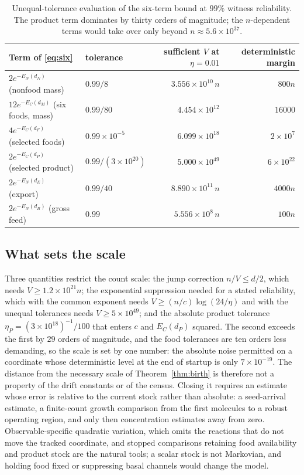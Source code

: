 \documentclass[11pt,letterpaper]{article}
\theoremstyle{plain}
\theoremstyle{definition}
\theoremstyle{remark}
\numberwithin{equation}{section}
\newcommand{\floorstock}{(3\times10^{18})^{-1}}
\begin{document}
\begin{table}[t]
\centering\small
\begin{tabular}{@{}llrr@{}}
\toprule
Term of \eqref{eq:six} & tolerance & sufficient $V$ at $\eta=0.01$ & deterministic margin\\
\midrule
$2e^{-E_N(d_N)}$ (nonfood mass) & $0.99/8$ & $3.556\times10^{10}\,n$ & $800n$\\
$12e^{-E_C(d_M)}$ (six foods, mass) & $0.99/80$ & $4.454\times10^{12}$ & $16000$\\
$4e^{-E_C(d_F)}$ (selected foods) & $0.99\times10^{-5}$ & $6.099\times10^{18}$ & $2\times10^7$\\
$2e^{-E_C(d_P)}$ (selected product) & $0.99/(3\times10^{20})$ & $5.000\times10^{49}$ & $6\times10^{22}$\\
$2e^{-E_N(d_E)}$ (export) & $0.99/40$ & $8.890\times10^{11}\,n$ & $4000n$\\
$2e^{-E_N(d_B)}$ (gross feed) & $0.99$ & $5.556\times10^{8}\,n$ & $100n$\\
\bottomrule
\end{tabular}
\caption{Unequal-tolerance evaluation of the six-term bound at $99\%$ witness reliability. The product term dominates by thirty orders of magnitude; the $n$-dependent terms would take over only beyond $n\approx5.6\times10^{37}$.}
\label{tab:unequal}
\end{table}

\subsection{What sets the scale}
Three quantities restrict the count scale: the jump correction $n/V\le d/2$, which needs $V\ge1.2\times10^{21}n$; the exponential suppression needed for a stated reliability, which with the common exponent needs $V\ge(n/c)\log(24/\eta)$ and with the unequal tolerances needs $V\ge5\times10^{49}$; and the absolute product tolerance $\eta_P=\floorstock/100$ that enters $c$ and $E_C(d_P)$ squared. The second exceeds the first by $29$ orders of magnitude, and the food tolerances are ten orders less demanding, so the scale is set by one number: the absolute noise permitted on a coordinate whose deterministic level at the end of startup is only $7\times10^{-19}$. The distance from the necessary scale of Theorem~\ref{thm:birth} is therefore not a property of the drift constants or of the census. Closing it requires an estimate whose error is relative to the current stock rather than absolute: a seed-arrival estimate, a finite-count growth comparison from the first molecules to a robust operating region, and only then concentration estimates away from zero. Observable-specific quadratic variation, which omits the reactions that do not move the tracked coordinate, and stopped comparisons retaining food availability and product stock are the natural tools; a scalar stock is not Markovian, and holding food fixed or suppressing basal channels would change the model.
\end{document}
